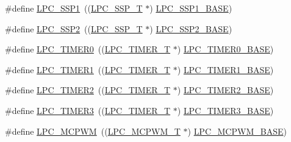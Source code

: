 \begin{DoxyCompactItemize}
\item 
\#define \hyperlink{group__PERIPH__177X__8X__BASE_ga09c4610ada1d9aa18913963cbd1a6e52}{L\-P\-C\-\_\-\-S\-S\-P1}~((\hyperlink{structLPC__SSP__T}{L\-P\-C\-\_\-\-S\-S\-P\-\_\-\-T}              $\ast$) \hyperlink{group__PERIPH__407X__8X__BASE_ga05d118997f53f596d3a087f8b91a1969}{L\-P\-C\-\_\-\-S\-S\-P1\-\_\-\-B\-A\-S\-E})
\item 
\#define \hyperlink{group__PERIPH__177X__8X__BASE_ga1e342299e20b4a502b4c71d292fc8eeb}{L\-P\-C\-\_\-\-S\-S\-P2}~((\hyperlink{structLPC__SSP__T}{L\-P\-C\-\_\-\-S\-S\-P\-\_\-\-T}              $\ast$) \hyperlink{group__PERIPH__407X__8X__BASE_ga1460d4b0a86fa00b3d3ef8abd21abbc1}{L\-P\-C\-\_\-\-S\-S\-P2\-\_\-\-B\-A\-S\-E})
\item 
\#define \hyperlink{group__PERIPH__177X__8X__BASE_ga800f32a8a38d9e9c8f3b6ab161f6f2d2}{L\-P\-C\-\_\-\-T\-I\-M\-E\-R0}~((\hyperlink{structLPC__TIMER__T}{L\-P\-C\-\_\-\-T\-I\-M\-E\-R\-\_\-\-T}            $\ast$) \hyperlink{group__PERIPH__407X__8X__BASE_ga58d2cc2a6a4bd9319853ad5b62a20d43}{L\-P\-C\-\_\-\-T\-I\-M\-E\-R0\-\_\-\-B\-A\-S\-E})
\item 
\#define \hyperlink{group__PERIPH__177X__8X__BASE_ga0d28200f11e877cece24025ebe7fe72a}{L\-P\-C\-\_\-\-T\-I\-M\-E\-R1}~((\hyperlink{structLPC__TIMER__T}{L\-P\-C\-\_\-\-T\-I\-M\-E\-R\-\_\-\-T}            $\ast$) \hyperlink{group__PERIPH__407X__8X__BASE_ga077e94a95d95d79f6aeb0ea962377c46}{L\-P\-C\-\_\-\-T\-I\-M\-E\-R1\-\_\-\-B\-A\-S\-E})
\item 
\#define \hyperlink{group__PERIPH__177X__8X__BASE_gae0a3c421e7e1ac3ffd7e740e33387dc5}{L\-P\-C\-\_\-\-T\-I\-M\-E\-R2}~((\hyperlink{structLPC__TIMER__T}{L\-P\-C\-\_\-\-T\-I\-M\-E\-R\-\_\-\-T}            $\ast$) \hyperlink{group__PERIPH__407X__8X__BASE_gab46122134a159b494e060ae3a7be0967}{L\-P\-C\-\_\-\-T\-I\-M\-E\-R2\-\_\-\-B\-A\-S\-E})
\item 
\#define \hyperlink{group__PERIPH__177X__8X__BASE_gab34ae64ea250497b5148b7ffb61d04f5}{L\-P\-C\-\_\-\-T\-I\-M\-E\-R3}~((\hyperlink{structLPC__TIMER__T}{L\-P\-C\-\_\-\-T\-I\-M\-E\-R\-\_\-\-T}            $\ast$) \hyperlink{group__PERIPH__407X__8X__BASE_ga002e95d51eef32473052ea2575440eac}{L\-P\-C\-\_\-\-T\-I\-M\-E\-R3\-\_\-\-B\-A\-S\-E})
\item 
\#define \hyperlink{group__PERIPH__177X__8X__BASE_ga6fe8e415821195a786b3f0dc5e7fc9fa}{L\-P\-C\-\_\-\-M\-C\-P\-W\-M}~((\hyperlink{structLPC__MCPWM__T}{L\-P\-C\-\_\-\-M\-C\-P\-W\-M\-\_\-\-T}            $\ast$) \hyperlink{group__PERIPH__407X__8X__BASE_gad8a41dc802e3ea0ba9457d42a6927c03}{L\-P\-C\-\_\-\-M\-C\-P\-W\-M\-\_\-\-B\-A\-S\-E})

\end{DoxyCompactItemize}
